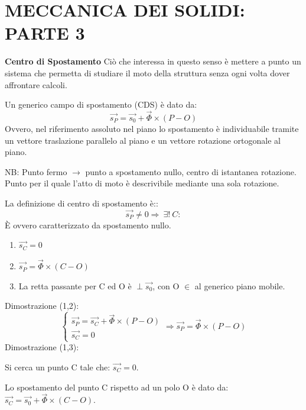 \documentclass{article}
\begin{document}
	\section*{MECCANICA DEI SOLIDI: PARTE 3} %
	
	\begin{adjustwidth}{2in}{} 
		
	{\Large \textbf{Centro di Spostamento}} \mbox{} \newline
Ciò che interessa in questo senso è mettere a punto un sistema che permetta di studiare il moto della struttura senza ogni volta dover affrontare calcoli. \newline
	
Un generico campo di spostamento (CDS) è dato da:
\[
\vec{s_P} = \vec{s_0} + \vec{\Phi} \times (P-O)
\]		
Ovvero, nel riferimento assoluto nel piano lo spostamento è individuabile tramite un vettore traslazione parallelo al piano e un vettore rotazione ortogonale al piano.	\newline

NB: Punto fermo $\rightarrow$ punto a spostamento nullo, centro di istantanea rotazione. Punto per il quale l'atto di moto è descrivibile mediante una sola rotazione. \newline

La definizione di centro di spostamento è:: 
\[
\vec{s_P} \ne 0 \Rightarrow ~ \exists! ~ C :
\]
È ovvero caratterizzato da spostamento nullo. 
\begin{enumerate} 
\item $\vec{s_C} = 0$
\item $\vec{s_P} = \vec{\Phi} \times (C-O)$
\item La retta passante per C ed O è $\perp \vec{s_0}$, con O $\in$ al generico piano mobile.
\end{enumerate}
Dimostrazione (1,2):
\[
\begin{cases}
	\vec{s_P} = \vec{s_C} + \vec{\Phi} \times (P-O) \\
	\vec{s_C} = 0
\end{cases} \Rightarrow \vec{s_P} = \vec{\Phi} \times (P-O)
\]
Dimostrazione (1,3):

Si cerca un punto C tale che: $\vec{s_C} = 0$. 

Lo spostamento del punto C rispetto ad un polo O è dato da: $\vec{s_C} = \vec{s_0} + \vec{\Phi} \times (C-O)$.


\end{adjustwidth}
\end{document}
